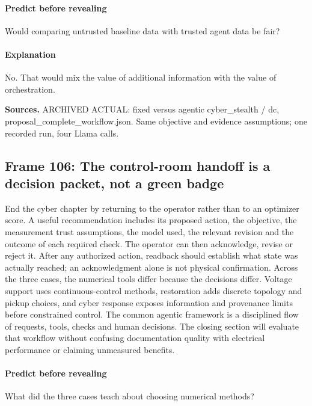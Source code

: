 \documentclass[11pt]{article}
\begin{document}
\paragraph{Predict before revealing}Would comparing untrusted baseline data with trusted agent data be fair?
\paragraph{Explanation}No. That would mix the value of additional information with the value of orchestration.
\par\nopagebreak\begin{minipage}{\linewidth}{\footnotesize\color{slate}\textbf{Sources.} ARCHIVED ACTUAL: fixed versus agentic cyber\_stealth / dc, proposal\_complete\_workflow.json. Same objective and evidence assumptions; one recorded run, four Llama calls.\par}\end{minipage}\par\medskip
\subsection*{Frame 106: The control-room handoff is a decision packet, not a green badge}
End the cyber chapter by returning to the operator rather than to an optimizer score. A useful recommendation includes its proposed action, the objective, the measurement trust assumptions, the model used, the relevant revision and the outcome of each required check. The operator can then acknowledge, revise or reject it. After any authorized action, readback should establish what state was actually reached; an acknowledgment alone is not physical confirmation. Across the three cases, the numerical tools differ because the decisions differ. Voltage support uses continuous-control methods, restoration adds discrete topology and pickup choices, and cyber response exposes information and provenance limits before constrained control. The common agentic framework is a disciplined flow of requests, tools, checks and human decisions. The closing section will evaluate that workflow without confusing documentation quality with electrical performance or claiming unmeasured benefits.\par
\paragraph{Predict before revealing}What did the three cases teach about choosing numerical methods?
\end{document}

